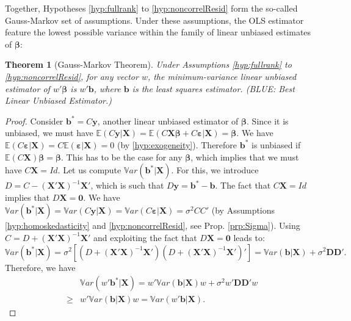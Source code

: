 \documentclass[
  12pt,
]{book}
\newtheorem{theorem}{Theorem}[chapter]
\theoremstyle{definition}
\theoremstyle{definition}
\theoremstyle{definition}
\theoremstyle{definition}
\theoremstyle{remark}
\begin{document}
Together, Hypotheses \ref{hyp:fullrank} to \ref{hyp:noncorrelResid} form the so-called Gauss-Markov set of assumptions. Under these assumptions, the OLS estimator feature the lowest possible variance within the family of linear unbiased estimates of \(\boldsymbol\beta\):

\begin{theorem}[Gauss-Markov Theorem]
\protect\hypertarget{thm:GaussMarkov}{}\label{thm:GaussMarkov}Under Assumptions \ref{hyp:fullrank} to \ref{hyp:noncorrelResid}, for any vector \(w\), the minimum-variance linear unbiased estimator of \(w' \boldsymbol\beta\) is \(w' \mathbf{b}\), where \(\mathbf{b}\) is the least squares estimator. (BLUE: Best Linear Unbiased Estimator.)
\end{theorem}

\begin{proof}
Consider \(\mathbf{b}^* = C \mathbf{y}\), another linear unbiased estimator of \(\boldsymbol\beta\). Since it is unbiased, we must have \(\mathbb{E}(C\mathbf{y}|\mathbf{X}) = \mathbb{E}(C\mathbf{X}\boldsymbol\beta + C\boldsymbol\varepsilon|\mathbf{X}) = \boldsymbol\beta\). We have \(\mathbb{E}(C\boldsymbol\varepsilon|\mathbf{X})=C\mathbb{E}(\boldsymbol\varepsilon|\mathbf{X})=0\) (by \ref{hyp:exogeneity}). Therefore \(\mathbf{b}^*\) is unbiased if \(\mathbb{E}(C\mathbf{X})\boldsymbol\beta=\boldsymbol\beta\). This has to be the case for any \(\boldsymbol\beta\), which implies that we must have \(C\mathbf{X}=Id\). Let us compute \(\mathbb{V}ar(\mathbf{b^*}|\mathbf{X})\). For this, we introduce \(D = C - (\mathbf{X}'\mathbf{X})^{-1}\mathbf{X}'\), which is such that \(D\mathbf{y}=\mathbf{b}^*-\mathbf{b}\). The fact that \(C\mathbf{X}=Id\) implies that \(D\mathbf{X} = \mathbf{0}\). We have \(\mathbb{V}ar(\mathbf{b^*}|\mathbf{X}) = \mathbb{V}ar(C \mathbf{y}|\mathbf{X}) =\mathbb{V}ar(C \boldsymbol\varepsilon|\mathbf{X}) = \sigma^2CC'\) (by Assumptions \ref{hyp:homoskedasticity} and \ref{hyp:noncorrelResid}, see Prop. \ref{prp:Sigma}). Using \(C=D+(\mathbf{X}'\mathbf{X})^{-1}\mathbf{X}'\) and exploiting the fact that \(D\mathbf{X} = \mathbf{0}\) leads to:
\[
\mathbb{V}ar(\mathbf{b^*}|\mathbf{X}) =\sigma^2\left[(D+(\mathbf{X}'\mathbf{X})^{-1}\mathbf{X}')(D+(\mathbf{X}'\mathbf{X})^{-1}\mathbf{X}')'\right] = \mathbb{V}ar(\mathbf{b}|\mathbf{X}) + \sigma^2 \mathbf{D}\mathbf{D}'.
\]
Therefore, we have
\begin{eqnarray*}
&&\mathbb{V}ar(w'\mathbf{b^*}|\mathbf{X})=w'\mathbb{V}ar(\mathbf{b}|\mathbf{X})w + \sigma^2 w'\mathbf{D}\mathbf{D}'w\\
&\ge& w'\mathbb{V}ar(\mathbf{b}|\mathbf{X})w=\mathbb{V}ar(w'\mathbf{b}|\mathbf{X}).
\end{eqnarray*}
\end{proof}
\end{document}
